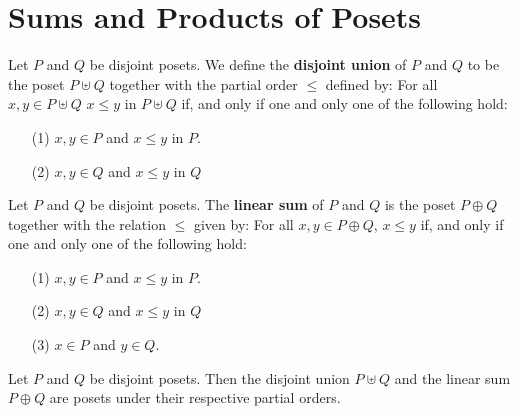 \section{Sums and Products of Posets}
\label{section_1.5}

\begin{definition}
  Let $P$ and $Q$ be disjoint posets. We define the \textbf{disjoint
  union} of $P$ and $Q$ to be the poset $P \uplus Q$ together with
  the partial order $\leq$ defined by: For all $x,y \in P \uplus Q$
  $x \leq  y $ in $P \uplus Q$ if, and only if one and only one of
  the following hold:
  \begin{enumerate}
    \item[(1)] $x,y \in P$ and $x \leq y$ in $P$.

    \item[(2)] $x,y \in Q$ and $x \leq y$ in $Q$
  \end{enumerate}
\end{definition}

\begin{definition}
  Let $P$ and $Q$ be disjoint posets. The \textbf{linear sum} of $P$
  and $Q$ is the poset $P \oplus Q$ together with the relation $\leq$
  given by: For all $x,y \in P \oplus Q$, $x \leq y$ if, and only if
  one and only one of the following hold:
  \begin{enumerate}
    \item[(1)] $x,y \in P$ and $x \leq y$ in $P$.

    \item[(2)] $x,y \in Q$ and $x \leq y$ in $Q$

    \item[(3)] $x \in P$ and $y \in Q$.
  \end{enumerate}
\end{definition}

\begin{proposition}\label{proposition_1.5.1}
  Let $P$ and $Q$ be disjoint posets. Then the disjoint union $P
  \uplus Q$ and the linear sum $P \oplus Q$ are posets under their
  respective partial orders.
\end{proposition}

